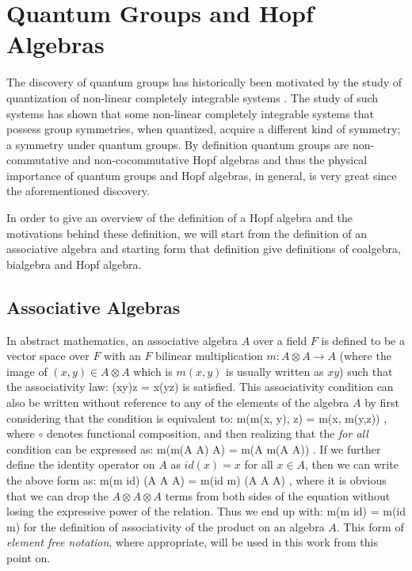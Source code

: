 \section{Quantum Groups and Hopf Algebras}


The discovery of quantum groups has historically been motivated by the study
of quantization of non-linear completely integrable systems \cite{sklyanin}. The study of
such systems has shown that some non-linear completely integrable systems that
possess group symmetries, when quantized, acquire a different kind of symmetry;
a symmetry under quantum groups. By definition quantum groups are non-commutative and
non-cocommutative Hopf algebras and thus the physical importance of quantum groups and
Hopf algebras, in general, is very great since the aforementioned discovery.


In order to give an overview of the definition of a Hopf algebra and the motivations
behind these definition, we will start from the definition of an associative algebra
and starting form that definition give definitions of coalgebra, bialgebra and Hopf
algebra.


\subsection{Associative Algebras}
In abstract mathematics, an associative algebra $A$ over a field $F$ is
defined to be a vector space over
$F$ with an $F$ bilinear multiplication $m: A \otimes A \rightarrow A$ (where the image of
$(x, y) \in A \otimes A$ which is $m(x,y)$ is usually written as $xy$) such that the associativity
law:
\beq
(xy)z = x(yz) \quad {}
\eeq
is satisfied. This associativity condition can also be written without reference to any of
the elements of the algebra $A$ by first considering that the condition is equivalent to:
\beq
m\circ(m(x, y), z) = m\circ(x, m(y,z)) \quad {},
\eeq
where $\circ$ denotes functional composition,
and then realizing that the {\it for all} condition can be expressed as:
\beq
m\circ(m(A \otimes A) \otimes A) = m\circ(A \otimes m(A \otimes A)) \quad .
\eeq
If we further define the identity operator on $A$ as $id(x) = x$
for all $x \in A$, then we can write the above form as:
\beq
m\circ(m \otimes id) (A \otimes A \otimes A) = m\circ(id \otimes m) (A \otimes A \otimes A) \quad ,
\eeq
where it is obvious that we can drop the $A \otimes A \otimes A$ terms from both sides
of the equation without losing the expressive power of the relation. Thus we end up with:
\beq
m\circ(m \otimes id) = m\circ(id \otimes m)
\eeq
for the definition of associativity of the product on an algebra $A$. This form of {\it element free
notation}, where appropriate, will be used in this work from this point on.


